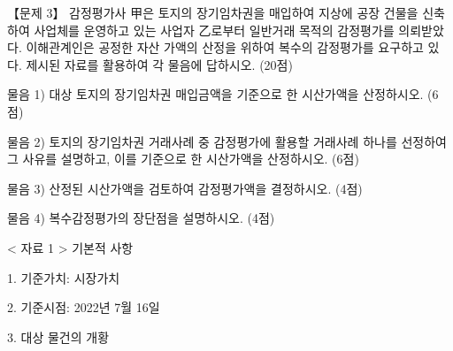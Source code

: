\begin{longquestion}{【문제 3】}
감정평가사 甲은 토지의 장기임차권을 매입하여 지상에 공장 건물을 신축하여 사업체를 운영하고 있는 사업자 乙로부터 일반거래 목적의 감정평가를 의뢰받았다. 이해관계인은 공정한 자산 가액의 산정을 위하여 복수의 감정평가를 요구하고 있다. 제시된 자료를 활용하여 각 물음에 답하시오. (20점) \par
\medskip\noindent 물음 1) 대상 토지의 장기임차권 매입금액을 기준으로 한 시산가액을 산정하시오. (6점) \par
\medskip\noindent 물음 2) 토지의 장기임차권 거래사례 중 감정평가에 활용할 거래사례 하나를 선정하여 그 사유를 설명하고, 이를 기준으로 한 시산가액을 산정하시오. (6점) \par
\medskip\noindent 물음 3) 산정된 시산가액을 검토하여 감정평가액을 결정하시오. (4점) \par
\medskip\noindent 물음 4) 복수감정평가의 장단점을 설명하시오. (4점) \par
< 자료 1 > 기본적 사항 \par
1. 기준가치: 시장가치 \par
2. 기준시점: 2022년 7월 16일 \par
3. 대상 물건의 개황 \par
{\small\centering\renewcommand{\arraystretch}{1.25}
\par}


\end{longquestion}
